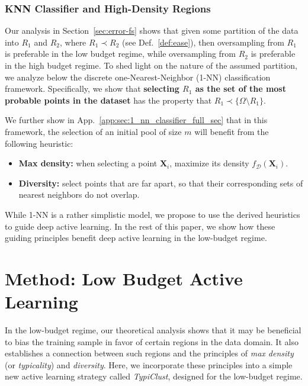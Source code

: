\documentclass{article}
\newcommand{\bX}{{\mathbf X}}
\newcommand{\Dd}{\mathcal{D}}
\newcommand{\pR}{1}\newcommand{\rR}{2}\newcommand{\prR}{i}
\newcommand{\app}{App.}
\begin{document}
\subsubsection{KNN Classifier and High-Density Regions}
\label{sec:high_density}

Our analysis in Section~\ref{sec:error-fs} shows that given some partition of the data into $R_\pR$ and $R_\rR$, where $R_\pR\prec R_\rR$ (see Def.~\ref{def:ease}), then oversampling from $R_\pR$ is preferable in the low budget regime, while oversampling from $R_\rR$ is preferable in the high budget regime. To shed light on the nature of the assumed partition, we analyze below the discrete one-Nearest-Neighbor (1-NN) classification framework. Specifically, we show that \textbf{selecting $R_\pR$ as the set of the most probable points in the dataset} has the property that $R_\pR\prec \{\Omega\setminus{R_\pR}\}$. 

We further show in \app~\ref{app:sec:1_nn_classifier_full_sec} that in this framework, the selection of an initial pool of size $m$ will benefit from the following heuristic: 
\begin{itemize}[noitemsep]
    \item \textbf{Max density:} when selecting a point $\bX_i$, maximize its density $f_\Dd(\bX_i)$.
    \item \textbf{Diversity:} select points that are far apart, so that their corresponding sets of nearest neighbors do not overlap.
\end{itemize}

While 1-NN is a rather simplistic model, we propose to use the derived heuristics to guide deep active learning. In the rest of this paper, we show how these guiding principles benefit deep active learning in the low-budget regime.


\section{Method: Low Budget Active Learning}
\label{sec:active_learning_low_budget}


In the low-budget regime, our theoretical analysis shows that it may be beneficial to bias the training sample in favor of certain regions in the data domain. It also establishes a connection between such regions and the principles of \emph{max density} (or \emph{typicality}) and \emph{diversity}. Here, we incorporate these principles into a simple new active learning strategy called \emph{TypiClust}, designed for the low-budget regime.
\end{document}
